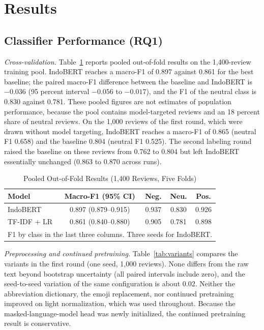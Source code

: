\documentclass[conference]{IEEEtran}
\begin{document}
\section{Results}\label{sec:results}
\subsection{Classifier Performance (RQ1)}
\textit{Cross-validation.} Table~\ref{tab:cv} reports pooled out-of-fold results on the 1,400-review training pool. IndoBERT reaches a macro-F1 of 0.897 against 0.861 for the best baseline; the paired macro-F1 difference between the baseline and IndoBERT is $-0.036$ (95 percent interval $-0.056$ to $-0.017$), and the F1 of the neutral class is 0.830 against 0.781. These pooled figures are not estimates of population performance, because the pool contains model-targeted reviews and an 18 percent share of neutral reviews. On the 1,000 reviews of the first round, which were drawn without model targeting, IndoBERT reaches a macro-F1 of 0.865 (neutral F1 0.658) and the baseline 0.804 (neutral F1 0.525). The second labeling round raised the baseline on these reviews from 0.762 to 0.804 but left IndoBERT essentially unchanged (0.863 to 0.870 across runs).

\begin{table}[htbp]
\caption{Pooled Out-of-Fold Results (1,400 Reviews, Five Folds)}
\begin{center}
\footnotesize
\begin{tabular}{|l|c|c|c|c|}
\hline
\textbf{Model} & \textbf{Macro-F1 (95\% CI)} & \textbf{Neg.} & \textbf{Neu.} & \textbf{Pos.} \\
\hline
IndoBERT & 0.897 (0.879--0.915) & 0.937 & 0.830 & 0.926 \\
TF-IDF + LR & 0.861 (0.840--0.880) & 0.905 & 0.781 & 0.898 \\
\hline
\multicolumn{5}{l}{F1 by class in the last three columns. Three seeds for IndoBERT.}
\end{tabular}
\label{tab:cv}
\end{center}
\end{table}

\textit{Preprocessing and continued pretraining.} Table~\ref{tab:variants} compares the variants in the first round (one seed, 1,000 reviews). None differs from the raw text beyond bootstrap uncertainty (all paired intervals include zero), and the seed-to-seed variation of the same configuration is about 0.02. Neither the abbreviation dictionary, the emoji replacement, nor continued pretraining improved on light normalization, which was used throughout. Because the masked-language-model head was newly initialized, the continued pretraining result is conservative.
\end{document}
